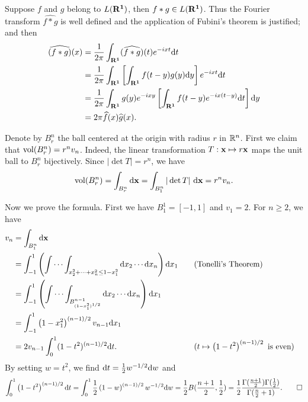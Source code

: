 \begin{exercise}{6.6}
	Suppose $f$ and $g$ belong to $L(\mathbf{R^1})$, then $f\ast g\in L(\mathbf{R^1})$. Thus the Fourier transform $\widehat{f\ast g}$ is well defined and the application of Fubini’s theorem is justified; and then
	\begin{equation*}
		\begin{aligned}
		\widehat{(f\ast g)}(x)&=\frac{1}{2\pi}\int_{\mathbf{R^1}} (\widehat{f\ast g})(t)e^{-ixt}\mathrm{d} t\\
		&=\frac{1}{2\pi}\int_{\mathbf{R^1}} \left[\int_{\mathbf{R^1}}f(t-y)g(y)\mathrm{d} y\right]e^{-ixt}\mathrm{d} t\\
		&=\frac{1}{2\pi}\int_{\mathbf{R^1}} g(y)e^{-ixy}\left[\int_{\mathbf{R^1}}f(t-y)e^{-ix(t-y)}\mathrm{d} t\right]\mathrm{d} y\\
		&=2\pi \widehat{f}(x)\widehat{g}(x).
		\end{aligned}
	\end{equation*}
\end{exercise}

\begin{exercise}{6.10}
  Denote by $B^n_r$ the ball centered at the origin
  with radius $r$ in $\mathbb{R}^{n}$.
  First we claim that $\operatorname{vol}(B^n_r) = r^n v_n$.
  Indeed, the linear transformation $T : \mathbf{x} \mapsto r\mathbf{x}$
  maps the unit ball to $B^n_r$ bijectively.
  Since $|\det{T}| = r^n$, we have
  \[
    \operatorname{vol}(B^n_r) = \int_{B^n_r} \mathrm{d} \mathbf{x}
    = \int_{B^n_1} |\det{T}| \ \mathrm{d} \mathbf{x}
    = r^n v_n.
  \]

  Now we prove the formula.
  First we have $B^1_1 = [-1, 1]$ and $v_1 = 2$.
  For $n \ge 2$, we have
  \[
    \begin{aligned}
      v_n &= \int_{B^n_1} \mathrm{d} \mathbf{x} \\
      &= \int_{-1}^1 \left(\idotsint_{x_2^2 + \cdots + x_n^2 \le 1 - x_1^2}
      \mathrm{d} x_2 \cdots \mathrm{d} x_n\right) \mathrm{d} x_1 \quad
      &&(\text{Tonelli's Theorem}) \\
      &= \int_{-1}^1
      \left( \idotsint_{B^{n-1}_{(1-x_1^2)^{1/2}}} \mathrm{d} x_2 \cdots \mathrm{d} x_n \right)
      \mathrm{d} x_1 \\
      &= \int_{-1}^1 \left( 1 - x_1^2 \right)^{(n-1)/2} v_{n-1} \mathrm{d} x_1 \\
      &= 2 v_{n-1} \int_0^1 (1-t^2)^{(n-1)/2} \mathrm{d} t.
      \quad &&(t \mapsto \left( 1-t^2 \right)^{(n-1)/2} \text{ is even})
    \end{aligned}
  \]
  By setting $w = t^2$, we find $\mathrm{d} t = \frac{1}{2} w^{-1/2} \mathrm{d} w$ and
  \[
    \int_0^1 \left( 1-t^2 \right)^{(n-1)/2} \mathrm{d} t
    = \int_0^1 \frac{1}{2} \left( 1-w \right)^{(n-1)/2} w^{-1/2} \mathrm{d} w
    = \frac{1}{2} B(\frac{n+1}{2}, \frac{1}{2})
    = \frac{1}{2} \frac {\Gamma(\frac{n+1}{2}) \Gamma(\frac{1}{2})} {\Gamma(\frac{n}{2}+1)}.
    \qedhere
  \]
\end{exercise}


